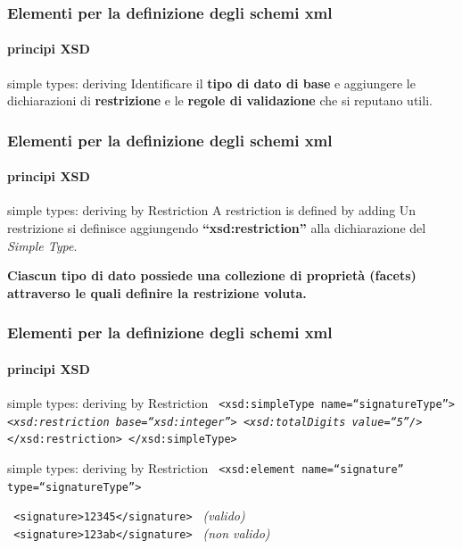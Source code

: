 \begin{frame}
	\frametitle{Elementi per la definizione degli schemi xml}
	\framesubtitle{principi XSD}
	\addtocounter{nframe}{1}

	\begin{block}{simple types: deriving}
		Identificare il \textbf{tipo di dato di base} e aggiungere le dichiarazioni di \textbf{restrizione} e le \textbf{regole di validazione} che si reputano utili.
	\end{block}

\end{frame}

\begin{frame}
	\frametitle{Elementi per la definizione degli schemi xml}
	\framesubtitle{principi XSD}
	\addtocounter{nframe}{1}

	\begin{block}{simple types: deriving by Restriction}
		A restriction is defined by adding
		Un restrizione si definisce aggiungendo \textbf{``xsd:restriction''} alla dichiarazione del \textit{Simple Type}. 
	\end{block}

	\textbf{Ciascun tipo di dato possiede una collezione di proprietà (facets) attraverso le quali definire la restrizione voluta.}

\end{frame}

\begin{frame}
	\frametitle{Elementi per la definizione degli schemi xml}
	\framesubtitle{principi XSD}
	\addtocounter{nframe}{1}

	\begin{block}{simple types: deriving by Restriction}
		\texttt{
			<xsd:simpleType name=``signatureType''>
			\emph{<xsd:restriction base=``xsd:integer''>}
			\emph{<xsd:totalDigits value=``5''/>}
			</xsd:restriction>
			</xsd:simpleType>
		}
	\end{block}

	\begin{block}{simple types: deriving by Restriction}
		\texttt{
			<xsd:element name=``signature'' type=``signatureType''>
		}
		
		
		\texttt{
			<signature>12345</signature>
		} \textit{(valido)}
		\\\texttt{
			<signature>123ab</signature>
		} \textit{(non valido)}
	\end{block}
\end{frame}


